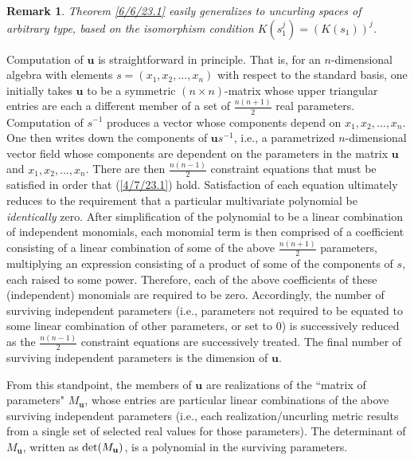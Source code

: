 \documentclass{amsart}
\numberwithin{equation}{section}
\newtheorem{remark}[theorem]{Remark}
\theoremstyle{definition}
\numberwithin{theorem}{section}
\begin{document}
\begin{remark} \label{9/18/23.1} {\rm Theorem \ref{6/6/23.1} easily generalizes to uncurling spaces of arbitrary type, based on the isomorphism condition $K(s_1^j) = (K(s_1))^j$.   } \end{remark}

Computation of $\mathbf{u}$ is straightforward in principle.  That is, for an $n$-dimensional algebra with elements $s = (x_1,x_2,\dots,x_n)$ with respect to the standard basis, one initially takes $\mathbf{u}$ to be a symmetric $(n\times n)$-matrix  whose upper triangular entries are each a different member of a set of $\frac{n(n+1)}{2}$ real parameters.  Computation of $s^{-1}$ produces a vector whose components depend on $x_1,x_2,\dots,x_n$.  One then writes down the components of $\mathbf{u}s^{-1}$, i.e., a parametrized $n$-dimensional vector field whose components are dependent on the parameters in the matrix $\mathbf{u}$ and $x_1,x_2,\dots,x_n$.  There are then $\frac{n(n-1)}{2}$ constraint equations that must be satisfied in order that (\ref{4/7/23.1}) hold.  Satisfaction of each equation ultimately reduces to the requirement that a particular multivariate polynomial be {\it identically} zero.  After simplification of the polynomial to be a linear combination of independent monomials, each monomial term is then comprised of a coefficient consisting of a linear combination of some of the above $\frac{n(n+1)}{2}$ parameters, multiplying an expression consisting of a product of some of the components of $s$, each raised to some power.  Therefore, each of the above coefficients of these (independent) monomials are required to be zero.  Accordingly, the number of surviving independent parameters (i.e., parameters not required to be equated to some linear combination of other parameters, or set to 0) is successively reduced as the $\frac{n(n-1)}{2}$ constraint equations are successively treated.  The final number of surviving independent parameters is the dimension of $\mathbf{u}$.

\enlargethispage{1.5cm}
From this standpoint, the members of $\mathbf{u}$ are realizations of the ``matrix of parameters" $M_{\mathbf{u}}$, whose entries are particular linear combinations of the above surviving independent parameters (i.e., each realization/uncurling metric results from a single set of selected real values for those parameters).  The determinant of $M_{\mathbf{u}}$, written as ${\rm det}(M_{\mathbf{u}})$, is a polynomial in the surviving parameters.  
\end{document}
